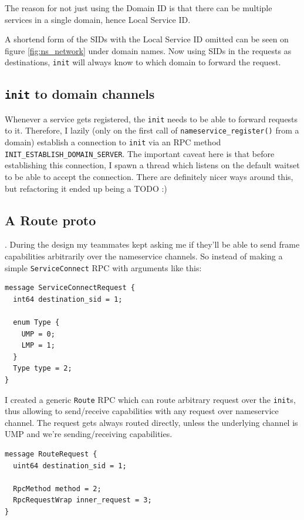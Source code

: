 The reason for not just using the Domain ID is that there can be multiple services in a single domain, hence Local Service ID.

A shortend form of the SIDs with the Local Service ID omitted can be seen on figure \ref{fig:ns_network} under domain names. Now using SIDs in the requests as destinations, \texttt{init} will always know to which domain to forward the request.

\subsection{\texttt{init} to domain channels}
Whenever a service gets registered, the \texttt{init} needs to be able to forward requests to it. Therefore, I lazily (only on the first call of \texttt{nameservice_register()} from a domain) establish a connection to \texttt{init} via an RPC method \texttt{INIT_ESTABLISH_DOMAIN_SERVER}. The important caveat here is that before establishing this connection, I spawn a thread which listens on the default waitset to be able to accept the connection. There are definitely nicer ways around this, but refactoring it ended up being a TODO :)

\subsection{A Route proto}.
During the design my teammates kept asking me if they'll be able to send frame capabilities arbitrarily over the nameservice channels. So instead of making a simple \texttt{ServiceConnect} RPC with arguments like this:
\begin{verbatim}
message ServiceConnectRequest {
  int64 destination_sid = 1;
  
  enum Type {
    UMP = 0;
    LMP = 1;
  }
  Type type = 2;
}
\end{verbatim}

I created a generic \texttt{Route} RPC which can route arbitrary request over the \texttt{init}s, thus allowing to send/receive capabilities with any request over nameservice channel. The request gets always routed directly, unless the underlying channel is UMP and we're sending/receiving capabilities.
\begin{verbatim}
message RouteRequest {
  uint64 destination_sid = 1;

  RpcMethod method = 2;
  RpcRequestWrap inner_request = 3;
}
\end{verbatim}

